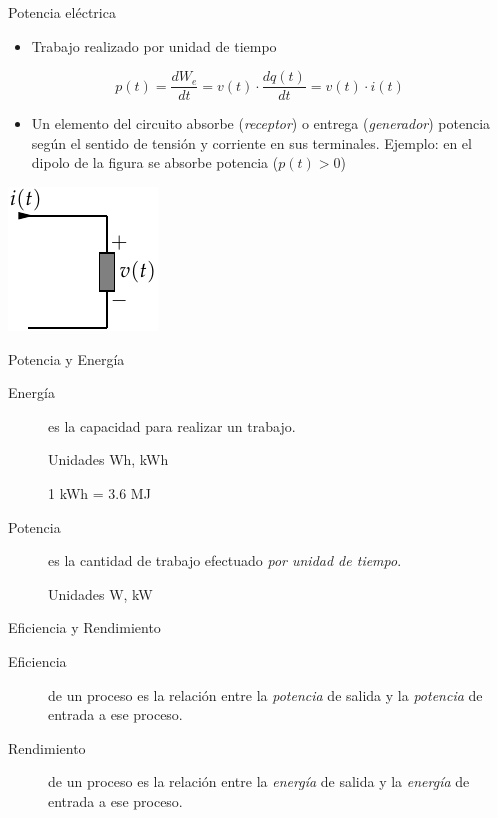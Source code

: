 \documentclass[xcolor={usenames,svgnames,dvipsnames}]{beamer}
\begin{document}
\begin{frame}[label={sec:orgf752aad}]{Potencia eléctrica}
\begin{itemize}
\item Trabajo realizado por unidad de tiempo
\end{itemize}
\[
p(t)=\frac{dW_{e}}{dt}=v(t)\cdot\frac{dq(t)}{dt}=v(t)\cdot i(t)
\]

\begin{itemize}
\item Un elemento del circuito absorbe (\emph{receptor}) o entrega
(\emph{generador}) potencia según el sentido de tensión y corriente en
sus terminales. Ejemplo: en el dipolo de la figura se absorbe
potencia (\(p(t)>0\))
\end{itemize}
\begin{center}
\includegraphics[height=0.5\textheight]{../figs/ReceptorPasivo.pdf}
\end{center}
\end{frame}

\begin{frame}[label={sec:orgc9fefaa}]{Potencia y Energía}
\begin{description}
\item[{Energía}] es la capacidad para realizar un trabajo.

Unidades Wh, kWh

1 kWh = 3.6 MJ

\item[{Potencia}] es la cantidad de trabajo efectuado \emph{por unidad de
tiempo}.

Unidades W, kW
\end{description}
\end{frame}

\begin{frame}[label={sec:orge3ab0a7}]{Eficiencia y Rendimiento}
\begin{description}
\item[{Eficiencia}] de un proceso es la relación entre la \emph{potencia} de
salida y la \emph{potencia} de entrada a ese proceso.

\item[{Rendimiento}] de un proceso es la relación entre la \emph{energía} de
salida y la \emph{energía} de entrada a ese proceso.
\end{description}
\end{frame}
\end{document}
